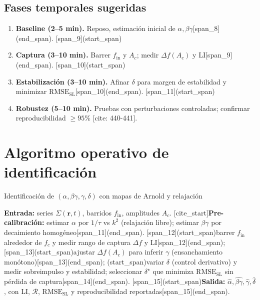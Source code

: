 \documentclass[11pt,letterpaper]{article}
\newcommand{\Sig}{\Sigma}
\newcommand{\LI}{\mathrm{LI}}
\newcommand{\RMSESL}{\mathrm{RMSE}_{\mathrm{SL}}}
\newcommand{\RR}{\mathcal{R}}
\newcommand{\Ac}{A_c}
\begin{document}
\subsection*{Fases temporales sugeridas}
\begin{enumerate}[label=\textbf{S\arabic*:}, leftmargin=*, itemsep=2pt]
[span_8](start_span)\item \textbf{Baseline (2--5 min).} Reposo, estimación inicial de $\alpha,\beta\gamma$[span_8](end_span).
[span_9](start_span)\item \textbf{Captura (3--10 min).} Barrer $f_{\mathrm{in}}$ y $\Ac$; medir $\Delta f(\Ac)$ y $\LI$[span_9](end_span).
[span_10](start_span)\item \textbf{Estabilización (3--10 min).} Afinar $\delta$ para margen de estabilidad y minimizar $\RMSESL$[span_10](end_span).
[span_11](start_span)\item \textbf{Robustez (5--10 min).} Pruebas con perturbaciones controladas; confirmar reproducibilidad $\ge 95\%$ [cite: 440-441].
\end{enumerate}

\section{Algoritmo operativo de identificación}
\begin{algorithm}[H]
\caption{Identificación de $(\alpha,\beta\gamma,\gamma,\delta)$ con mapas de Arnold y relajación}
\begin{algorithmic}[1]
\State \textbf{Entrada:} series $\Sig(\mathbf r,t)$, barridos $f_{\mathrm{in}}$, amplitudes $\Ac$.
[cite_start]\State \textbf{Pre-calibración:} estimar $\alpha$ por $1/\tau$ vs $k^2$ (relajación libre); estimar $\beta\gamma$ por decaimiento homogéneo[span_11](end_span).
\For{cada amplitud $\Ac$}
  [span_12](start_span)\State barrer $f_{\mathrm{in}}$ alrededor de $f_c$ y medir rango de captura $\Delta f$ y $\LI$[span_12](end_span);
  [span_13](start_span)\State ajustar $\Delta f(\Ac)$ para inferir $\gamma$ (ensanchamiento monótono)[span_13](end_span);
\EndFor
[span_14](start_span)\State variar $\delta$ (control derivativo) y medir sobreimpulso y estabilidad; seleccionar $\delta^\star$ que minimiza $\RMSESL$ sin pérdida de captura[span_14](end_span).
[span_15](start_span)\State \textbf{Salida:} $\hat\alpha,\widehat{\beta\gamma},\hat\gamma,\hat\delta$, con LI, $\RR$, $\RMSESL$ y reproducibilidad reportadas[span_15](end_span).
\end{algorithmic}
\end{algorithm}
\end{document}
